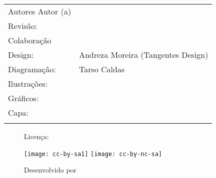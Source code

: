 {\begin{titlingpage}
\begin{tabular}{p{}p{}}
			\ifdefined\la@autores Autores \else Autor (a) \fi  & \ifdefined\la@autores \la@autores@table \else \la@autor \fi             \\

			\ifrevisao
			Revisão:                                           & \ifdefined\la@revisores \la@revisores \else \la@revisor \fi             \\
			\fi

			\ifdefined\la@colaboracao
			Colaboração                                        & \la@colaboracao                                                         \\
			\else\fi

			Design:                                            & Andreza Moreira (Tangentes Design)                                    \\

			Diagramação:                                       & Tarso Caldas                                                          \\

			\ifdefined\la@ilustracao
			Ilustrações:                                       & \la@ilustracao                                                          \\
			\else\fi

			\ifdefined\la@graficos
			Gráficos:                                          & \la@graficos                                                            \\
			\else\fi

			\ifdefined\la@autorcapa
			Capa:                                              & \la@autorcapa                                                           \\
			\else\fi
		\end{tabular}

		\vfill
		\begin{figure}[b]
			\begin{minipage}[l]{5cm}
				\centering

				{\large Licença:}

				\vspace{1em}

				\ifdefined\la@ccbysa
					\texttt{[image: cc-by-sa1]}
				\else
					\texttt{[image: cc-by-nc-sa]}
				\fi

			\end{minipage}\hfill
			\begin{minipage}[c]{5cm}
				\centering
				{\large Desenvolvido por}


\end{minipage}
\end{figure}
\end{titlingpage}}
